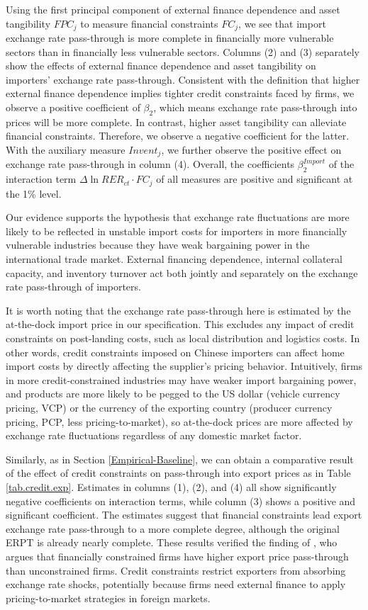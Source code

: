 Using the first principal component of external finance dependence and asset tangibility $FPC_j$ to measure financial constraints $FC_j$, we see that import exchange rate pass-through is more complete in financially more vulnerable sectors than in financially less vulnerable sectors. Columns (2) and (3) separately show the effects of external finance dependence and asset tangibility on importers' exchange rate pass-through. Consistent with the definition that higher external finance dependence implies tighter credit constraints faced by firms, we observe a positive coefficient of $\beta_2$, which means exchange rate pass-through into prices will be more complete. In contrast, higher asset tangibility can alleviate financial constraints. Therefore, we observe a negative coefficient for the latter. With the auxiliary measure $Invent_j$, we further observe the positive effect on exchange rate pass-through in column (4). Overall, the coefficients $\beta^{Import}_2$ of the interaction term $\Delta \ln RER_{ct} \cdot FC_{j}$ of all measures are positive and significant at the 1\% level. 

Our evidence supports the hypothesis that exchange rate fluctuations are more likely to be reflected in unstable import costs for importers in more financially vulnerable industries because they have weak bargaining power in the international trade market. External financing dependence, internal collateral capacity, and inventory turnover act both jointly and separately on the exchange rate pass-through of importers.

It is worth noting that the exchange rate pass-through here is estimated by the at-the-dock import price in our specification. This excludes any impact of credit constraints on post-landing costs, such as local distribution and logistics costs. In other words, credit constraints imposed on Chinese importers can affect home import costs by directly affecting the supplier's pricing behavior. Intuitively, firms in more credit-constrained industries may have weaker import bargaining power, and products are more likely to be pegged to the US dollar (vehicle currency pricing, VCP) or the currency of the exporting country (producer currency pricing, PCP, less pricing-to-market), so at-the-dock prices are more affected by exchange rate fluctuations regardless of any domestic market factor.

Similarly, as in Section \ref{Empirical-Baseline}, we can obtain a comparative result of the effect of credit constraints on pass-through into export prices as in Table \ref{tab.credit.exp}. Estimates in columns (1), (2), and (4) all show significantly negative coefficients on interaction terms, while column (3) shows a positive and significant coefficient. The estimates suggest that financial constraints lead export exchange rate pass-through to a more complete degree, although the original ERPT is already nearly complete. These results verified the finding of \cite{strasser2013}, who argues that financially constrained firms have higher export price pass-through than unconstrained firms. Credit constraints restrict exporters from absorbing exchange rate shocks, potentially because firms need external finance to apply pricing-to-market strategies in foreign markets.

